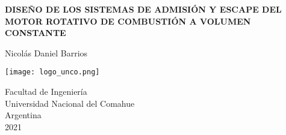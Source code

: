 \begin{titlepage}
    \begin{center}

        \vspace*{2cm}
        \huge
        \MakeUppercase{\textbf{Diseño de los sistemas de admisión y escape del
        Motor Rotativo de Combustión a Volumen Constante }}

        \vspace{0.8cm}
        Nicolás Daniel Barrios
        \vfill

        \vspace{0.8cm}
        \texttt{[image: logo\_unco.png]}
        \vspace{0.8cm}


        \large
        Facultad de Ingeniería \\
        Universidad Nacional del Comahue \\
        Argentina \\
        2021
    \end{center}
\end{titlepage}

